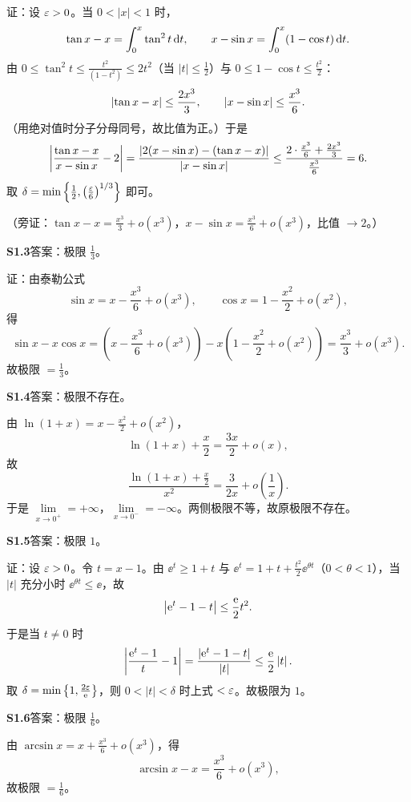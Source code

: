 证：设 $\varepsilon>0$。当 $0<|x|<1$ 时，
\[
\tan x-x=\int_{0}^{x}\tan^{2}t\,\mathrm{d} t,\qquad x-\sin x=\int_{0}^{x}(1-\cos t)\,\mathrm{d} t.
\]
由 $0\leq\tan^{2}t\leq\frac{t^{2}}{(1-t^{2})}\leq 2t^{2}$（当 $|t|\leq\frac12$）与 $0\leq1-\cos t\leq\frac{t^{2}}2$：
\[
\left\lvert \tan x-x\right\rvert\leq\frac{2x^{3}}{3},\qquad \left\lvert x-\sin x\right\rvert\leq\frac{x^{3}}{6}.
\]
（用绝对值时分子分母同号，故比值为正。）于是
\[
\left|\frac{\tan x-x}{x-\sin x}-2\right|
=\frac{\left\lvert 2(x-\sin x)-(\tan x-x)\right\rvert}{\left\lvert x-\sin x\right\rvert}
\leq\frac{2\cdot\frac{x^{3}}{6}+\frac{2x^{3}}3}{\frac{x^{3}}{6}}=6.
\]
取 $\delta=\min\left\{\frac12,\left(\frac{\varepsilon}{6}\right)^{1/3}\right\}$ 即可。

（旁证：$\tan x-x=\frac{x^{3}}3+o(x^{3})$，$x-\sin x=\frac{x^{3}}6+o(x^{3})$，比值 $\to2$。）

\medskip
\noindent\textbf{S1.3}\quad 答案：极限 $\frac13$。

证：由泰勒公式
\[
\sin x=x-\frac{x^{3}}6+o(x^{3}),\qquad \cos x=1-\frac{x^{2}}2+o(x^{2}),
\]
得
\[
\sin x-x\cos x=\left(x-\frac{x^{3}}6+o(x^{3})\right)-x\left(1-\frac{x^{2}}2+o(x^{2})\right)=\frac{x^{3}}3+o(x^{3}).
\]
故极限 $=\frac13$。

\medskip
\noindent\textbf{S1.4}\quad 答案：极限不存在。

由 $\ln(1+x)=x-\frac{x^{2}}2+o(x^{2})$，
\[
\ln(1+x)+\frac{x}{2}=\frac{3x}{2}+o(x),
\]
故
\[
\frac{\ln(1+x)+\frac{x}{2}}{x^{2}}=\frac{3}{2x}+o\left(\frac1x\right).
\]
于是 $\lim\limits_{x\to0^{+}}=+\infty$，$\lim\limits_{x\to0^{-}}=-\infty$。两侧极限不等，故原极限不存在。

\medskip
\noindent\textbf{S1.5}\quad 答案：极限 $1$。

证：设 $\varepsilon>0$。令 $t=x-1$。由 $\ee^{t}\geq1+t$ 与 $\ee^{t}=1+t+\frac{t^{2}}2\ee^{\theta t}$（$0<\theta<1$），当 $|t|$ 充分小时 $\ee^{\theta t}\leq\ee$，故
\[
\left\lvert \mathrm{e}^{t}-1-t\right\rvert\leq\frac{\mathrm{e}}{2}t^{2}.
\]
于是当 $t\neq0$ 时
\[
\left|\frac{\mathrm{e}^{t}-1}{t}-1\right|=\frac{\left\lvert \mathrm{e}^{t}-1-t\right\rvert}{\left\lvert t\right\rvert}\leq\frac{\mathrm{e}}{2}\left\lvert t\right\rvert.
\]
取 $\delta=\min\left\{1,\frac{2\varepsilon}{\mathrm{e}}\right\}$，则 $0<|t|<\delta$ 时上式 $<\varepsilon$。故极限为 $1$。

\medskip
\noindent\textbf{S1.6}\quad 答案：极限 $\frac16$。

由 $\arcsin x=x+\frac{x^{3}}6+o(x^{3})$，得
\[
\arcsin x-x=\frac{x^{3}}6+o(x^{3}),
\]
故极限 $=\frac16$。

